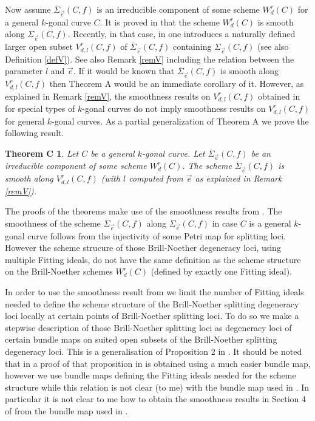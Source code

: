 \documentclass{article}
\newtheorem*{theoremC}{Theorem C}
\theoremstyle{definition}
\theoremstyle{remark}
\begin{document}
Now assume $\overline {\Sigma}_{\overrightarrow {e}}(C,f)$ is an irreducible component of some scheme $W^r_d(C)$ for a general $k$-gonal curve $C$.
It is proved in \cite {ref2} that the scheme $W^r_d(C)$ is smooth along $\Sigma_{\overrightarrow {e}}(C,f)$.
Recently, in that case, in \cite{FFR} one introduces a naturally defined larger open subset $V^r_{d,l}(C,f)$ of $\overline {\Sigma}_{\overrightarrow {e}}(C,f)$ containing $\Sigma _{\overrightarrow {e}}(C,f)$ (see also Definition \ref{defV}).
See also Remark \ref {remV} including the relation between the parameter $l$ and $\overrightarrow {e}$.
If it would be known that $\overline{\Sigma}_{\overrightarrow {e}}(C,f)$ is smooth along $V^r_{d,l}(C,f)$ then Theorem A would be an immediate corollary of it.
However, as explained in Remark \ref {remV}, the smoothness results on $V^r_{d,l}(C,f)$ obtained in \cite {FFR} for special types of $k$-gonal curves do not imply smoothness results on $V^r_{d,l}(C,f)$ for general $k$-gonal curves.
As a partial generalization of Theorem A we prove the following result.

\begin{theoremC}
Let $C$ be a general $k$-gonal curve.
Let $\overline{\Sigma}_{\overrightarrow {e}}(C,f)$ be an irreducible component of some scheme $W^r_d(C)$.
The scheme $\overline{\Sigma}_{\overrightarrow{e}}(C,f)$ is smooth along $V^r_{d,l}(C,f)$ (with $l$ computed from $\overrightarrow {e}$ as explained in Remark \ref{remV}).
\end{theoremC}

The proofs of the theorems make use of the smoothness results from \cite{ref7}.
The smoothness of the scheme $\overline{\Sigma}_{\overrightarrow {e}}(C,f)$ along $\Sigma _{\overrightarrow {e}}(C,f)$ in case $C$ is a general $k$-gonal curve follows from the injectivity of some Petri map for splitting loci.
However the scheme strucure of those Brill-Noether degeneracy loci, using multiple Fitting ideals, do not have the same definition as the scheme structure on the Brill-Noether schemes $W^r_d(C)$ (defined by exactly one Fitting ideal).


In order to use the smoothness result from \cite{ref7} we limit the number of Fitting ideals needed to define the scheme structure of the Brill-Noether splitting degeneracy loci locally at certain points of Brill-Noether splitting loci.
To do so we make a stepwise description of those Brill-Noether splitting loci as degeneracy loci of certain bundle maps on suited open subsets of the Brill-Noether splitting degeneracy loci.
This is a generalisation of Proposition 2 in \cite{ref2}.
It should be noted that in \cite{FFR} a proof of that proposition in \cite{ref2} is obtained using a much easier bundle map, however we use bundle maps defining the Fitting ideals needed for the scheme structure while this relation is not clear (to me) with the bundle map used in \cite{FFR}.
In particular it is not clear to me how to obtain the smoothness results in Section 4 of \cite{ref2} from the bundle map used in \cite{FFR}.
\end{document}

